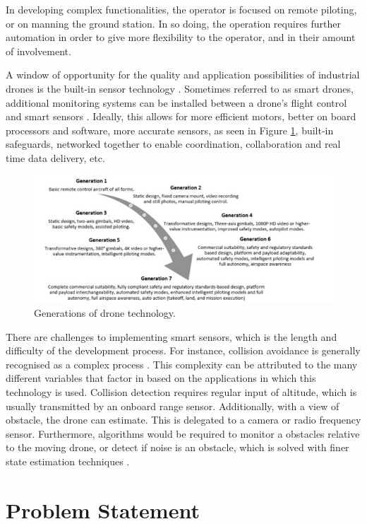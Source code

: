 In developing complex functionalities, the operator is focused on remote piloting, or on manning the ground station. In so doing, the operation requires further automation in order to give more flexibility to the operator, and in their amount of involvement. 

A window of opportunity for the quality and application possibilities of industrial drones is the built-in sensor technology \cite{scientific_research}. Sometimes referred to as smart drones, additional monitoring systems can be installed between a drone's flight control and smart sensors \cite{uav_components}. Ideally, this allows for more efficient motors, better on board processors and software, more accurate sensors, as seen in Figure \ref{fig:drone_gens}, built-in safeguards, networked together to enable coordination, collaboration and real time data delivery, etc. 

\begin{figure}[!h]
  \raggedright
  \includegraphics[width=11.5cm]{images/intro/gen_evolution_bw.jpg}
  \caption{Generations of drone technology.} 
  \label{fig:drone_gens}
\end{figure}

There are challenges to implementing smart sensors, which is the length and difficulty of the development process. For instance, collision avoidance is generally recognised as a complex process \cite{landing_challenges}\cite{autonomy_survey}. This complexity can be attributed to the many different variables that factor in based on the applications in which this technology is used. Collision detection requires regular input of altitude, which is usually transmitted by an onboard range sensor. Additionally, with a view of obstacle, the drone can estimate. This is delegated to a camera or radio frequency sensor. Furthermore, algorithms would be required to monitor a obstacles relative to the moving drone, or detect if noise is an obstacle, which is solved with finer state estimation techniques \cite{px4_landing}. 

\section{Problem Statement}

